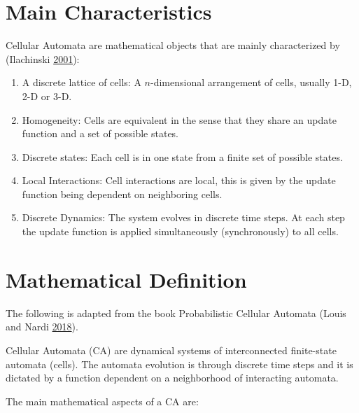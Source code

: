 \documentclass[
  openany]{book}
\begin{document}
\hypertarget{main-characteristics}{%
\section{Main Characteristics}\label{main-characteristics}}

Cellular Automata are mathematical objects that are mainly characterized by (Ilachinski \protect\hyperlink{ref-ilachinski2001cellular}{2001}):

\begin{enumerate}
\def\labelenumi{\arabic{enumi}.}
\item
  A discrete lattice of cells:
  A \(n\)-dimensional arrangement of cells, usually 1-D, 2-D or 3-D.
\item
  Homogeneity:
  Cells are equivalent in the sense that they share an update function and a set of possible states.
\item
  Discrete states:
  Each cell is in one state from a finite set of possible states.
\item
  Local Interactions:
  Cell interactions are local, this is given by the update function being dependent on neighboring cells.
\item
  Discrete Dynamics:
  The system evolves in discrete time steps. At each step the update function is applied simultaneously (synchronously) to all cells.
\end{enumerate}

\hypertarget{mathematical-definition}{%
\section{Mathematical Definition}\label{mathematical-definition}}

The following is adapted from the book Probabilistic Cellular Automata (Louis and Nardi \protect\hyperlink{ref-louis2018probabilistic}{2018}).

Cellular Automata (CA) are dynamical systems of interconnected finite-state automata (cells). The automata evolution is through discrete time steps and it is dictated by a function dependent on a neighborhood of interacting automata.

The main mathematical aspects of a CA are:
\end{document}
